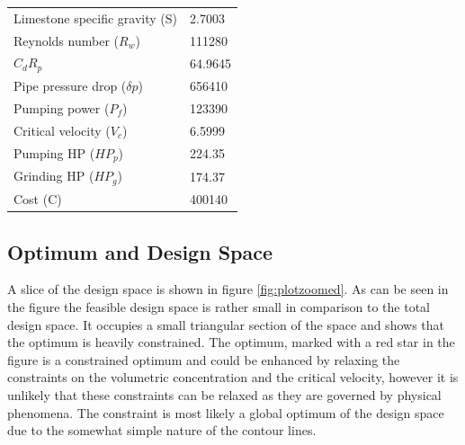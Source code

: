 \documentclass{article}
\begin{document}
\begin{center}
\begin{tabular}{|l|l|}
	Limestone specific gravity (S)           & 2.7003                    \\
	Reynolds number ($R_w$)                  & 111280                    \\
	$C_dR_p$                                 & 64.9645                   \\
	Pipe pressure drop ($\delta p$)          & 656410                    \\
	Pumping power ($P_f$)                    & 123390                    \\
	Critical velocity ($V_c$)                & 6.5999                    \\
	Pumping HP ($HP_p$)						 & 224.35					 \\
	Grinding HP ($HP_g$)					 & 174.37					 \\
	Cost (C)                                 & 400140                    \\
	\hline
\end{tabular}
\end{center}
\subsection{Optimum and Design Space}
A slice of the design space is shown in figure \ref{fig:plotzoomed}.  As can be seen in the figure the feasible design space is rather small in comparison to the total design space. It occupies a small triangular section of the space and shows that the optimum is heavily constrained. The optimum, marked with a red star in the figure is a constrained optimum and could be enhanced by relaxing the constraints on the volumetric concentration and the critical velocity, however it is unlikely that these constraints can be relaxed as they are governed by physical phenomena.  The constraint is most likely a global optimum of the design space due to the somewhat simple nature of the contour lines.
\end{document}
